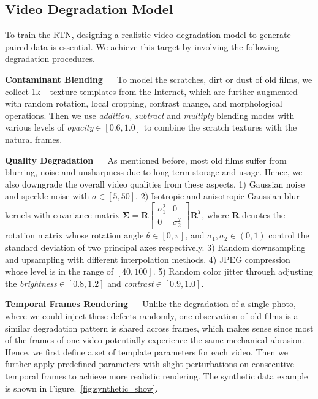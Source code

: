 \documentclass[10pt,twocolumn,letterpaper]{article}
\begin{document}
	\subsection{Video Degradation Model}\label{sec3.2}
	
	
	To train the RTN, designing a realistic video degradation model to generate paired data is essential. We achieve this target by involving the following degradation procedures.
	
	\noindent\textbf{Contaminant Blending} ~~ To model the scratches, dirt or dust of old films, we collect 1k+ texture templates from the Internet, which are further augmented with random rotation, local cropping, contrast change, and morphological operations. Then we use \textit{addition}, \textit{subtract} and \textit{multiply} blending modes with various levels of \textit{opacity}$\in [0.6,1.0]$ to combine the scratch textures with the natural frames.
	
	\noindent\textbf{Quality Degradation} ~~ As mentioned before, most old films suffer from blurring, noise and unsharpness due to long-term storage and usage. Hence, we also downgrade the overall video qualities from these aspects. 1)  Gaussian noise and speckle noise with $\sigma \in[5,50]$. 2) Isotropic and anisotropic Gaussian blur kernels with covariance matrix $\boldsymbol{\Sigma}=\boldsymbol{R}\left[\begin{array}{cc}
	\sigma_{1}^{2} & 0 \\
	0 & \sigma_{2}^{2}
	\end{array}\right] \boldsymbol{R}^{T}$, where $\boldsymbol{R}$ denotes the rotation matrix whose rotation angle $\theta \in [0,\pi]$, and $\sigma_{1}, \sigma_{2}\in (0,1)  $ control the  standard deviation of two principal axes respectively.  3) Random downsampling and upsampling with different interpolation methods. 4) JPEG compression whose
	level is in the range of $[40,100]$. 5) Random color jitter through adjusting the \textit{brightness}$\in [0.8,1.2]$ and \textit{contrast}$\in [0.9,1.0]$.
	
	\noindent\textbf{Temporal Frames Rendering} ~~ Unlike the degradation of a single photo, where we could inject these defects randomly, one observation of old films is a similar degradation pattern is shared across frames, which makes sense since most of the frames of one video potentially experience the same mechanical abrasion. Hence, we first define a set of template parameters for each video. Then we further apply predefined parameters with slight perturbations on consecutive temporal frames to achieve more realistic rendering. The synthetic data example is shown in Figure.~\ref{fig:synthetic_show}.
	
\end{document}
